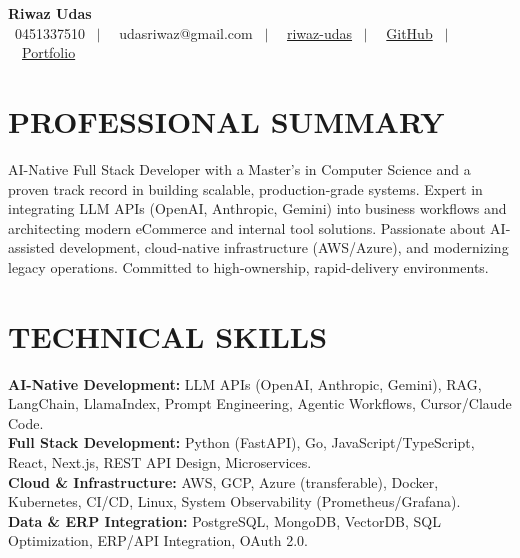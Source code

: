 \documentclass[letterpaper,11pt]{article}
\begin{document}
\begin{center}
    \textbf{\Huge Riwaz Udas} \\ \vspace{4pt}
    \scriptsize
    \faPhone* \ 0451337510 \ $|$ \
    \faEnvelope \ udasriwaz@gmail.com \ $|$ \
    \faLinkedin \ \href{https://www.linkedin.com/in/riwaz-udas-7aab521b1/}{riwaz-udas} \ $|$ \
    \faGithub \ \href{https://github.com/riwazudas}{GitHub} \ $|$ \
    \faGlobe \ \href{https://portfolio-website-496606.web.app}{Portfolio}
\end{center}

\section{PROFESSIONAL SUMMARY}
\small{AI-Native Full Stack Developer with a Master’s in Computer Science and a proven track record in building scalable, production-grade systems. Expert in integrating LLM APIs (OpenAI, Anthropic, Gemini) into business workflows and architecting modern eCommerce and internal tool solutions. Passionate about AI-assisted development, cloud-native infrastructure (AWS/Azure), and modernizing legacy operations. Committed to high-ownership, rapid-delivery environments.}

\section{TECHNICAL SKILLS}
\begin{itemize}[leftmargin=0in, label={}]
\small{\item{
\textbf{AI-Native Development:} LLM APIs (OpenAI, Anthropic, Gemini), RAG, LangChain, LlamaIndex, Prompt Engineering, Agentic Workflows, Cursor/Claude Code. \\
\textbf{Full Stack Development:} Python (FastAPI), Go, JavaScript/TypeScript, React, Next.js, REST API Design, Microservices. \\
\textbf{Cloud \& Infrastructure:} AWS, GCP, Azure (transferable), Docker, Kubernetes, CI/CD, Linux, System Observability (Prometheus/Grafana). \\
\textbf{Data \& ERP Integration:} PostgreSQL, MongoDB, VectorDB, SQL Optimization, ERP/API Integration, OAuth 2.0.
}}
\end{itemize}
\end{document}
